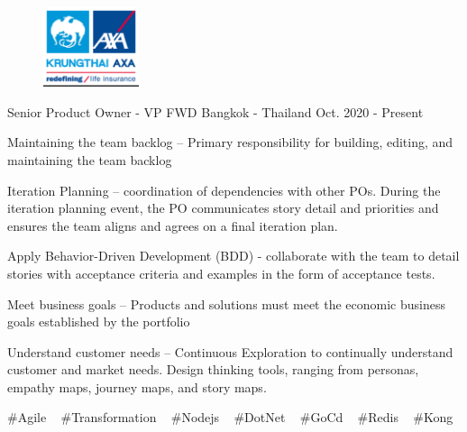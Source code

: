 

\begin{cventries}

\begin{figure} %
    \centering
    \includegraphics[width=0.25\textwidth]{axa}
\end{figure}

  \cventry
    {Senior Product Owner - VP} %
    {FWD} %
    {Bangkok - Thailand} %
    {Oct. 2020 - Present} %
    {
      \begin{cvitems} %
        \item {Maintaining the team backlog – Primary responsibility for building, editing, and maintaining the team backlog}
        \item {Iteration Planning – coordination of dependencies with other POs. During the iteration planning event, the PO communicates story detail and priorities and ensures the team aligns and agrees on a final iteration plan.}
        \item {Apply Behavior-Driven Development (BDD) - collaborate with the team to detail stories with acceptance criteria and examples in the form of acceptance tests.}
        \item {Meet business goals – Products and solutions must meet the economic business goals established by the portfolio}
        \item {Understand customer needs – Continuous Exploration to continually understand customer and market needs. Design thinking tools, ranging from personas, empathy maps, journey maps, and story maps.}
      \end{cvitems}
    }
    {
      \#Agile ~
      \#Transformation ~
      \#Nodejs ~
      \#DotNet ~
      \#GoCd ~
      \#Redis ~
      \#Kong ~
    }


\end{cventries}
